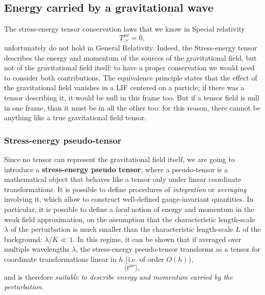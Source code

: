 \subsection{Energy carried by a gravitational wave}
The stress-energy tensor conservation laws that we know in Special relativity
\[
    T^{\mu\nu}_{,\nu}=0,
\]
unfortunately do not hold in General Relativity.
Indeed, the Stress-energy tensor describes the energy and momentum of the sources of the gravitational field, but not of the gravitational field itself: to have a proper conservation we would need to consider both contributions.
The equivalence principle states that the effect of the gravitational field vanishes in a LIF centered on a particle; if there was a tensor describing it, it would be null in this frame too.
But if a tensor field is null in one frame, than it must be in all the other too: for this reason, there cannot be anything like a true gravitational field tensor.

\subsubsection{Stress-energy pseudo-tensor}
Since no tensor can represent the gravitational field itself, we are going to introduce a \textbf{stress-energy pseudo tensor}, where a pseudo-tensor is a mathematical object that behaves like a tensor only under linear coordinate transformations.
It is possible to define procedures of \textit{integration} or \textit{averaging} involving it, which allow to construct well-defined gauge-invariant quantities.
In particular, it is possible to define a \textit{local} notion of energy and momentum in the weak field approximation, on the assumption that the characteristic length-scale $\lambda$ of the perturbation is much smaller than the characteristic length-scale $L$ of the background: $\lambda/K\ll 1$.
In this regime, it can be shown that if averaged over multiple wavelengths $\lambda$, the stress-energy pseudo-tensor transforms as a tensor for coordinate transformations linear in $h$ (i.e. of order $O(h)$),
\[
    \langle t^{\mu\nu}\rangle,
\]
and is therefore \textit{suitable to describe energy and momentum carried by the perturbation}.


